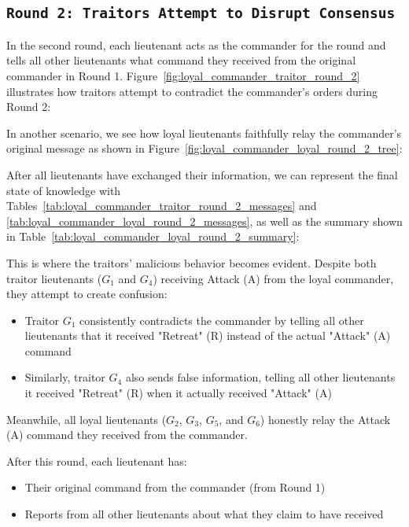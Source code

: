 \documentclass[11pt]{article}
\newcommand{\gen}[1]{\ensuremath{G_{#1}}}
\begin{document}
\subsection*{\texttt{\large Round 2: Traitors Attempt to Disrupt Consensus}}
\justifying
In the second round, each lieutenant acts as the commander for the round and tells all other lieutenants what command they received from the original commander in Round 1.
Figure~\ref{fig:loyal_commander_traitor_round_2} illustrates how traitors attempt to contradict the commander's orders during Round 2:




\justifying
In another scenario, we see how loyal lieutenants faithfully relay the commander's original message as shown in Figure~\ref{fig:loyal_commander_loyal_round_2_tree}:



\justifying
After all lieutenants have exchanged their information, we can represent the final state of knowledge with Tables~\ref{tab:loyal_commander_traitor_round_2_messages} and \ref{tab:loyal_commander_loyal_round_2_messages}, as well as the summary shown in Table~\ref{tab:loyal_commander_loyal_round_2_summary}:



\justifying
This is where the traitors' malicious behavior becomes evident. Despite both traitor lieutenants ($\gen{1}$ and $\gen{4}$) receiving Attack (A) from the loyal commander, they attempt to create confusion:

\begin{itemize}
    \item Traitor $\gen{1}$ consistently contradicts the commander by telling all other lieutenants that it received "Retreat" (R) instead of the actual "Attack" (A) command

    \item Similarly, traitor $\gen{4}$ also sends false information, telling all other lieutenants it received "Retreat" (R) when it actually received "Attack" (A)
\end{itemize}

Meanwhile, all loyal lieutenants ($\gen{2}$, $\gen{3}$, $\gen{5}$, and $\gen{6}$) honestly relay the Attack (A) command they received from the commander.

After this round, each lieutenant has:
\begin{itemize}
    \item Their original command from the commander (from Round 1)
    \item Reports from all other lieutenants about what they claim to have received
\end{itemize}
\end{document}
